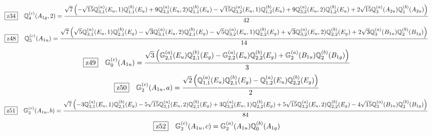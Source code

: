 \documentclass[fleqn,10pt,landscape]{jsarticle}
\begin{document}
\begin{dmath*}
\hspace*{3mm}\fbox{z34}\quad \mathbb{Q}_{4}^{(c)}(A_{1g},2)=\frac{\sqrt{7} \left(- \sqrt{15} \mathbb{Q}_{3,1}^{(a)}(E_{u},1) \mathbb{Q}_{1,1}^{(b)}(E_{u}) + 9 \mathbb{Q}_{3,1}^{(a)}(E_{u},2) \mathbb{Q}_{1,1}^{(b)}(E_{u}) - \sqrt{15} \mathbb{Q}_{3,2}^{(a)}(E_{u},1) \mathbb{Q}_{1,2}^{(b)}(E_{u}) + 9 \mathbb{Q}_{3,2}^{(a)}(E_{u},2) \mathbb{Q}_{1,2}^{(b)}(E_{u}) + 2 \sqrt{15} \mathbb{Q}_{3}^{(a)}(A_{2u}) \mathbb{Q}_{1}^{(b)}(A_{2u})\right)}{42}
\end{dmath*}
\begin{dmath*}
\hspace*{3mm}\fbox{z48}\quad \mathbb{Q}_{5}^{(c)}(A_{1u})=\frac{\sqrt{7} \left(\sqrt{5} \mathbb{Q}_{3,1}^{(a)}(E_{u},1) \mathbb{Q}_{2,1}^{(b)}(E_{g}) - \sqrt{3} \mathbb{Q}_{3,1}^{(a)}(E_{u},2) \mathbb{Q}_{2,1}^{(b)}(E_{g}) - \sqrt{5} \mathbb{Q}_{3,2}^{(a)}(E_{u},1) \mathbb{Q}_{2,2}^{(b)}(E_{g}) + \sqrt{3} \mathbb{Q}_{3,2}^{(a)}(E_{u},2) \mathbb{Q}_{2,2}^{(b)}(E_{g}) + 2 \sqrt{3} \mathbb{Q}_{3}^{(a)}(B_{1u}) \mathbb{Q}_{2}^{(b)}(B_{1g})\right)}{14}
\end{dmath*}
\begin{dmath*}
\hspace*{3mm}\fbox{z49}\quad \mathbb{G}_{0}^{(c)}(A_{1u})=\frac{\sqrt{3} \left(\mathbb{G}_{2,1}^{(a)}(E_{u}) \mathbb{Q}_{2,1}^{(b)}(E_{g}) - \mathbb{G}_{2,2}^{(a)}(E_{u}) \mathbb{Q}_{2,2}^{(b)}(E_{g}) + \mathbb{G}_{2}^{(a)}(B_{1u}) \mathbb{Q}_{2}^{(b)}(B_{1g})\right)}{3}
\end{dmath*}
\begin{dmath*}
\hspace*{3mm}\fbox{z50}\quad \mathbb{G}_{2}^{(c)}(A_{1u},a)=\frac{\sqrt{2} \left(\mathbb{Q}_{1,1}^{(a)}(E_{u}) \mathbb{Q}_{2,1}^{(b)}(E_{g}) - \mathbb{Q}_{1,2}^{(a)}(E_{u}) \mathbb{Q}_{2,2}^{(b)}(E_{g})\right)}{2}
\end{dmath*}
\begin{dmath*}
\hspace*{3mm}\fbox{z51}\quad \mathbb{G}_{2}^{(c)}(A_{1u},b)=\frac{\sqrt{7} \left(- 3 \mathbb{Q}_{3,1}^{(a)}(E_{u},1) \mathbb{Q}_{2,1}^{(b)}(E_{g}) - 5 \sqrt{15} \mathbb{Q}_{3,1}^{(a)}(E_{u},2) \mathbb{Q}_{2,1}^{(b)}(E_{g}) + 3 \mathbb{Q}_{3,2}^{(a)}(E_{u},1) \mathbb{Q}_{2,2}^{(b)}(E_{g}) + 5 \sqrt{15} \mathbb{Q}_{3,2}^{(a)}(E_{u},2) \mathbb{Q}_{2,2}^{(b)}(E_{g}) - 4 \sqrt{15} \mathbb{Q}_{3}^{(a)}(B_{1u}) \mathbb{Q}_{2}^{(b)}(B_{1g})\right)}{84}
\end{dmath*}
\begin{dmath*}
\hspace*{3mm}\fbox{z52}\quad \mathbb{G}_{2}^{(c)}(A_{1u},c)=\mathbb{G}_{2}^{(a)}(A_{1u}) \mathbb{Q}_{0}^{(b)}(A_{1g})
\end{dmath*}
\end{document}
